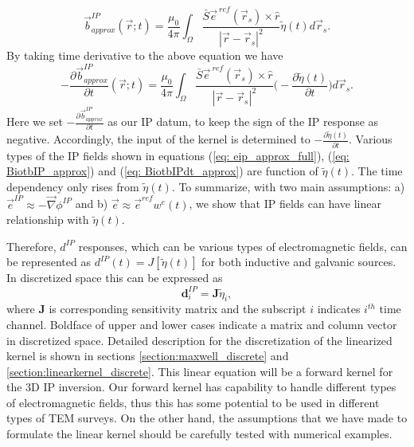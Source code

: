 \documentclass[a4paper, 11pt]{article}
\newcommand{\grad}{\vec \nabla}
\renewcommand {\b}  { {\vec b} }
\newcommand {\e}  { {\vec e} }
\newcommand{\peta}{\tilde{\eta}}
\newcommand{\eref}{\e^{\ ref}}
\newcommand{\dip}{d^{IP}}
\begin{document}
\begin{equation}
  \b^{IP}_{approx}(\vec{r}; t) = \frac{\mu_0}{4\pi}\int_{\Omega}  \frac{\bar{S}\eref(\vec{r}_s)\times\hat{r}}{|\vec{r}-\vec{r}_s|^2}\peta(t)d\vec{r}_s.
  \label{eq: BiotbIP_approx}
\end{equation}
By taking time derivative to the above equation we have
\begin{equation}
  -\frac{\partial\b^{IP}_{approx}}{\partial t}(\vec{r}; t) = \frac{\mu_0}{4\pi} \int_{\Omega}  \frac{\bar{S}\eref(\vec{r}_s)\times\hat{r}}{|\vec{r}-\vec{r}_s|^2} \Big( -\frac{\partial \peta(t)}{\partial t} \Big) d\vec{r}_s.
  \label{eq: BiotbIPdt_approx}
\end{equation}
Here we set $-\frac{\partial \b^{IP}_{approx}}{\partial t}$ as our IP datum, to keep the sign of the IP response as negative. 
Accordingly, the input of the kernel is determined to $-\frac{\partial \peta(t)}{\partial t}$. 
Various types of the IP fields shown in equations (\ref{eq: eip_approx_full}), (\ref{eq: BiotbIP_approx}) and (\ref{eq: BiotbIPdt_approx}) are function of $\peta(t)$.
The time dependency only rises from $\peta(t)$. 
To summarize, with two main assumptions: a) $\e^{IP}\approx -\grad\phi^{IP}$ and b) $\e \approx \e^{ref}w^e(t)$, we show that IP fields can have linear relationship with $\peta(t)$. 

Therefore, $\dip$ responses, which can be various types of electromagnetic fields, can be represented as $\dip(t) = J[\peta(t)]$ for both inductive and galvanic sources. In discretized space this can be expressed as
\begin{equation}
  \mathbf{d}^{IP}_i = \mathbf{J}\peta_i,
  \label{eq: dIP_lineareq}
\end{equation}
where $\mathbf{J}$ is corresponding sensitivity matrix and the subscript $i$ indicates $i^{th}$ time channel. 
Boldface of upper and lower cases indicate a matrix and column vector in discretized space. 
Detailed description for the discretization of the linearized kernel is shown in sections \ref{section:maxwell_discrete} and \ref{section:linearkernel_discrete}. 
This linear equation will be a forward kernel for the 3D IP inversion. 
Our forward kernel has capability to handle different types of electromagnetic fields, thus this has some potential to be used in different types of TEM surveys. 
On the other hand, the assumptions that we have made to formulate the linear kernel should be carefully tested with numerical examples.

\end{document}
